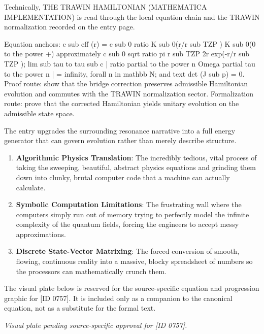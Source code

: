 Technically, THE TRAWIN HAMILTONIAN (MATHEMATICA IMPLEMENTATION) is read through the local equation chain and the TRAWIN normalization recorded on the entry page.

Equation anchors: c sub eff (r) = c sub 0 ratio K sub 0(r/r sub TZP ) K sub 0(0 to the power +) approximately c sub 0 sqrt ratio pi r sub TZP 2r exp(-r/r sub TZP ); lim sub tau to tau sub c | ratio partial to the power n Omega partial tau to the power n | = infinity, forall n in mathbb N; and text det (J sub p) = 0. Proof route: show that the bridge correction preserves admissible Hamiltonian evolution and commutes with the TRAWIN normalization sector. Formalization route: prove that the corrected Hamiltonian yields unitary evolution on the admissible state space.

The entry upgrades the surrounding resonance narrative into a full energy generator that can govern evolution rather than merely describe structure.
\endgroup

\begin{enumerate}[leftmargin=1.6em,itemsep=6pt,topsep=4pt]
\item \textbf{Algorithmic Physics Translation}: The incredibly tedious, vital process of taking the sweeping, beautiful, abstract physics equations and grinding them down into clunky, brutal computer code that a machine can actually calculate.
\item \textbf{Symbolic Computation Limitations}: The frustrating wall where the computers simply run out of memory trying to perfectly model the infinite complexity of the quantum fields, forcing the engineers to accept messy approximations.
\item \textbf{Discrete State-Vector Matrixing}: The forced conversion of smooth, flowing, continuous reality into a massive, blocky spreadsheet of numbers so the processors can mathematically crunch them.
\end{enumerate}

\begingroup\footnotesize\sloppy
The visual plate below is reserved for the source-specific equation and progression graphic for [ID 0757]. It is included only as a companion to the canonical equation, not as a substitute for the formal text.
\par\endgroup
\begingroup\footnotesize\itshape
Visual plate pending source-specific approval for [ID 0757].
\par\endgroup

